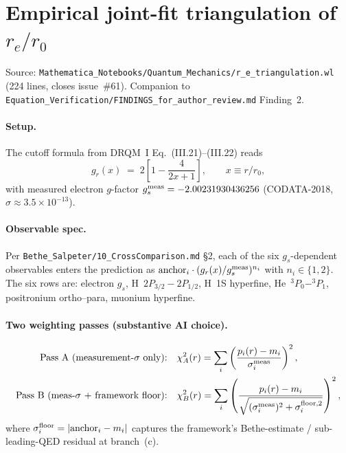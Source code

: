 \section{Empirical joint-fit triangulation of $r_e/r_0$}
\label{sec:eq-triangulation}

Source: \texttt{Mathematica\_Notebooks/Quantum\_Mechanics/r\_e\_triangulation.wl}
(224 lines, closes issue~\#61). Companion to
\texttt{Equation\_Verification/FINDINGS\_for\_author\_review.md} Finding~2.

\paragraph{Setup.}
The cutoff formula from DRQM~I Eq.~(III.21)--(III.22) reads
\[
g_r(x) \;=\; 2\left[1 - \frac{4}{2x + 1}\right], \qquad x \equiv r/r_0,
\]
with measured electron $g$-factor $g_s^{\rm meas} = -2.00231930436256$
(CODATA-2018, $\sigma \approx 3.5\times 10^{-13}$).

\paragraph{Observable spec.}
Per \texttt{Bethe\_Salpeter/10\_CrossComparison.md} \S2, each of the six
$g_s$-dependent observables enters the prediction as
$\mathrm{anchor}_i \cdot (g_r(x)/g_s^{\rm meas})^{n_i}$ with
$n_i \in \{1,2\}$. The six rows are: electron $g_s$,
H~$2P_{3/2}{-}2P_{1/2}$, H~1S hyperfine, He~$^3P_0{-}^3P_1$,
positronium ortho--para, muonium hyperfine.

\paragraph{Two weighting passes (substantive AI choice).}
\begin{align*}
\text{Pass A (measurement-}\sigma\text{ only):}\quad
  &\chi^2_A(r) = \sum_i \left(\frac{p_i(r) - m_i}{\sigma_i^{\rm meas}}\right)^2,\\
\text{Pass B (meas-}\sigma\text{ + framework floor):}\quad
  &\chi^2_B(r) = \sum_i \left(\frac{p_i(r) - m_i}{\sqrt{(\sigma_i^{\rm meas})^2 + \sigma_i^{\rm floor,2}}}\right)^2,
\end{align*}
where $\sigma_i^{\rm floor} = |{\rm anchor}_i - m_i|$ captures the framework's
Bethe-estimate / sub-leading-QED residual at branch~(c).

